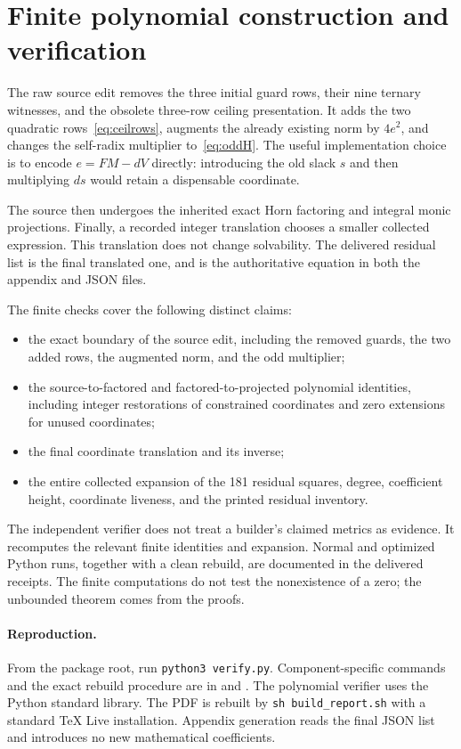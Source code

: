 \documentclass[11pt,letterpaper]{article}
\theoremstyle{remark}\newtheorem{remark}[theorem]{Remark}
\begin{document}
\section{Finite polynomial construction and verification}

The raw source edit removes the three initial guard rows, their nine ternary
witnesses, and the obsolete three-row ceiling presentation. It adds the two
quadratic rows~\eqref{eq:ceilrows}, augments the already existing norm by
\(4e^2\), and changes the self-radix multiplier to~\eqref{eq:oddH}.
The useful implementation choice is to encode
\(e=FM-dV\) directly: introducing the old slack \(s\) and then multiplying
\(ds\) would retain a dispensable coordinate.

The source then undergoes the inherited exact Horn factoring and integral
monic projections. Finally, a recorded integer translation chooses a
smaller collected expression. This translation does not change solvability.
The delivered residual list is the final translated one, and is the
authoritative equation in both the appendix and JSON files.

The finite checks cover the following distinct claims:
\begin{itemize}
\item the exact boundary of the source edit, including the removed guards,
the two added rows, the augmented norm, and the odd multiplier;
\item the source-to-factored and factored-to-projected polynomial identities,
including integer restorations of constrained coordinates and zero extensions
for unused coordinates;
\item the final coordinate translation and its inverse;
\item the entire collected expansion of the 181 residual squares, degree,
coefficient height, coordinate liveness, and the printed residual inventory.
\end{itemize}
The independent verifier does not treat a builder's claimed metrics as
evidence. It recomputes the relevant finite identities and expansion.
Normal and optimized Python runs, together with a clean rebuild, are
documented in the delivered receipts. The finite computations do not test
the nonexistence of a zero; the unbounded theorem comes from the proofs.

\paragraph{Reproduction.}
From the package root, run \texttt{python3 verify.py}. Component-specific
commands and the exact rebuild procedure are in  and
. The polynomial verifier uses the Python standard
library. The PDF is rebuilt by \texttt{sh build\_report.sh} with a standard
TeX Live installation. Appendix generation reads the final JSON list and
introduces no new mathematical coefficients.
\end{document}

